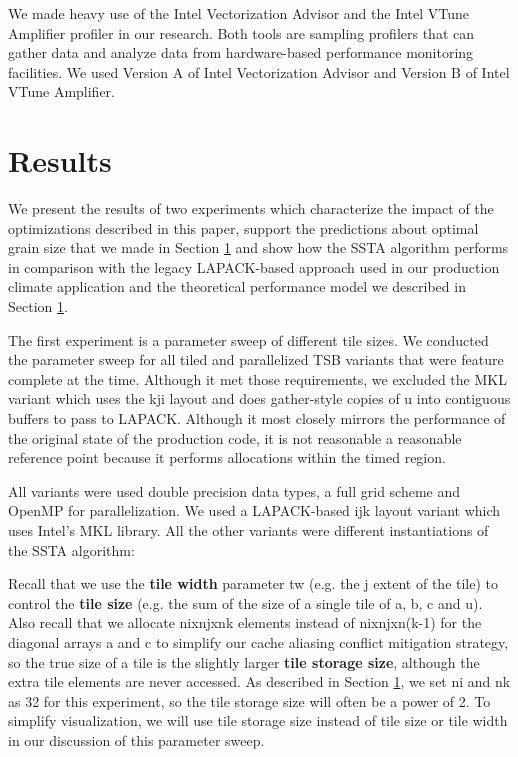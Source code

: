 \documentclass[conference]{IEEEtran}
\begin{document}
We made heavy use of the Intel Vectorization Advisor and the Intel VTune
Amplifier profiler in our research. Both tools are sampling profilers that can
gather data and analyze data from hardware-based performance monitoring
facilities. We used Version A of Intel Vectorization Advisor and Version B of
Intel VTune Amplifier.

\section{Results}

We present the results of two experiments which characterize the impact of the
optimizations described in this paper, support the predictions about optimal
grain size that we made in Section \ref{} and show how the SSTA algorithm
performs in comparison with the legacy LAPACK-based approach used in our
production climate application and the theoretical performance model we
described in Section \ref{}.

The first experiment is a parameter sweep of different tile sizes. We conducted
the parameter sweep for all tiled and parallelized TSB variants that were
feature complete at the time. Although it met those requirements, we excluded
the MKL variant which uses the kji layout and does gather-style copies of u
into contiguous buffers to pass to LAPACK. Although it most closely mirrors the
performance of the original state of the production code, it is not reasonable
a reasonable reference point because it performs allocations within the timed 
region.

All variants were used double precision data types, a full grid scheme and
OpenMP for parallelization. We used a LAPACK-based ijk layout variant which
uses Intel's MKL library. All the other variants were different instantiations
of the SSTA algorithm:


Recall that we use the \textbf{tile width} parameter tw (e.g. the j extent of
the tile) to control the \textbf{tile size} (e.g. the sum of the size of a
single tile of a, b, c and u). Also recall that we allocate nixnjxnk elements
instead of nixnjxn(k-1) for the diagonal arrays a and c to simplify our cache
aliasing conflict mitigation strategy, so the true size of a tile is the
slightly larger \textbf{tile storage size}, although the extra tile elements
are never accessed. As described in Section \ref{}, we set ni and nk as 32 for
this experiment, so the tile storage size will often be a power of 2. To
simplify visualization, we will use tile storage size instead of tile size or
tile width in our discussion of this parameter sweep.
\end{document}
